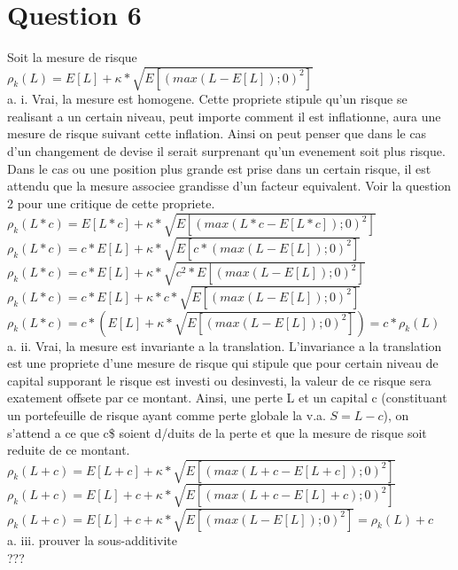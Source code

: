 \section{Question 6}
Soit la mesure de risque\\
$\rho_k(L) = E[L] + \kappa * \sqrt{E[(max(L-E[L]); 0)^2]}$\\

a. i. Vrai, la mesure est homogene. Cette propriete stipule qu'un risque se realisant a un certain niveau, peut importe comment il est inflationne, aura une mesure de risque suivant cette inflation. Ainsi on peut penser que dans le cas d'un changement de devise il serait surprenant qu'un evenement soit plus risque. Dans le cas ou une position plus grande est prise dans un certain risque, il est attendu que la mesure associee grandisse d'un facteur equivalent. Voir la question 2 pour une critique de cette propriete.\\

$\rho_k(L*c) = E[L*c] + \kappa * \sqrt{E[(max(L*c-E[L*c]); 0)^2]}$\\
$\rho_k(L*c) = c*E[L] + \kappa * \sqrt{E[c*(max(L-E[L]); 0)^2]}$\\
$\rho_k(L*c) = c*E[L] + \kappa * \sqrt{c^2 * E[(max(L-E[L]); 0)^2]}$\\
$\rho_k(L*c) = c*E[L] + \kappa * c* \sqrt{E[(max(L-E[L]); 0)^2]}$\\
$\rho_k(L*c) = c*(E[L] + \kappa * \sqrt{E[(max(L-E[L]); 0)^2]}) = c*\rho_k(L)$\\

a. ii. Vrai, la mesure est invariante a la translation. L'invariance a la translation est une propriete d'une mesure de risque qui stipule que pour certain niveau de capital supporant le risque est investi ou desinvesti, la valeur de ce risque sera exatement offsete par ce montant. Ainsi, une perte L et un capital c (constituant un portefeuille de risque ayant comme perte globale la v.a. $S = L-c$), on s'attend a ce que c\$ soient d/duits de la perte et que la mesure de risque soit reduite de ce montant. \\

$\rho_k(L+c) = E[L+c] + \kappa * \sqrt{E[(max(L+c-E[L+c]); 0)^2]}$\\
$\rho_k(L+c) = E[L]+c + \kappa * \sqrt{E[(max(L+c-E[L]+c); 0)^2]}$\\
$\rho_k(L+c) = E[L]+c + \kappa * \sqrt{E[(max(L-E[L]); 0)^2]} = \rho_k(L)+c$\\

a. iii. prouver la sous-additivite\\
???\\


